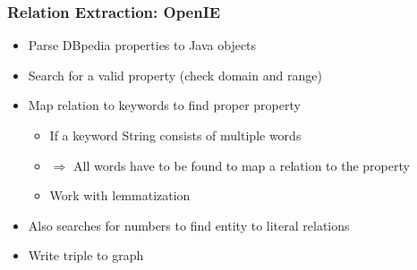 \documentclass{beamer}
\begin{document}
\begin{frame}
\frametitle{Relation Extraction: OpenIE }
\begin{itemize}
	\item Parse DBpedia properties to Java objects
	\item Search for a valid property (check domain and range)
	\item Map relation to keywords to find proper property 
	\begin{itemize}
		\item If a keyword String consists of multiple words
		\item[] $\Rightarrow$ All words have to be found to map a relation to the property
		\item Work with lemmatization
	\end{itemize}
	\item Also searches for numbers to find entity to literal relations
	\item Write triple to graph
\end{itemize}
\end{frame}
\end{document}
